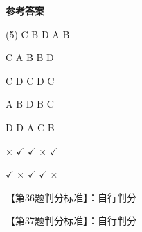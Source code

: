 \documentclass[11pt, a4paper]{article}
\begin{document}
\begin{center}
    \Huge \textbf{参考答案}
\end{center}

    \begin{tasks}[label=\arabic*. , label-width=14pt](5)
        \task C
        \task B
        \task D
        \task A
        \task B

        \task C
        \task A
        \task B
        \task B
        \task D

        \task C
        \task D
        \task C
        \task D
        \task C

        \task A
        \task B
        \task D
        \task B
        \task C

        \task D
        \task D
        \task A
        \task C
        \task B

        \task $\times$
        \task $\checkmark$
        \task $\checkmark$
        \task $\times$
        \task $\checkmark$

        \task $\checkmark$
        \task $\times$
        \task $\checkmark$
        \task $\checkmark$
        \task $\times$
    \end{tasks}

    【第36题判分标准】：自行判分

    【第37题判分标准】：自行判分
\end{document}
